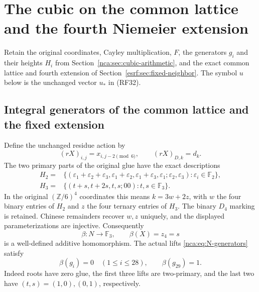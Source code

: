 \section{The cubic on the common lattice and the fourth Niemeier extension}
\label{jmv:sec:JM-extension}

Retain the original coordinates, Cayley multiplication, $F$, the generators $g_i$
and their heights $H_i$ from Section~\ref{nca:sec:cubic-arithmetic}, and the
exact common lattice and fourth extension of Section~\ref{esrf:sec:fixed-neighbor}.
The symbol $u$ below is the unchanged vector $u_*$ in (RF32).
\subsection{Integral generators of the common lattice and the fixed extension}

Define the unchanged residue action by
\[
 (rX)_{i,j}=x_{i,j-2\pmod6},\qquad (rX)_{D,k}=d_k.
\]
The two primary parts of the original glue have the exact descriptions
\begin{align*}
 H_2={}&\{(\varepsilon_1+\varepsilon_2+\varepsilon_3,
 \varepsilon_1+\varepsilon_2,\varepsilon_1+\varepsilon_3,
 \varepsilon_1;\varepsilon_2,\varepsilon_3):\varepsilon_i\in\mathbb F_2\},\\
 H_3={}&\{(t+s,t+2s,t,s;00):t,s\in\mathbb F_3\}.
\end{align*}
In the original \((\mathbb Z/6)^4\) coordinates this means
\(k=3w+2z\), with \(w\) the four binary entries of \(H_2\)
and \(z\) the four ternary entries of \(H_3\). The binary
\(D_4\) marking is retained. Chinese remainders recover \(w,z\)
uniquely, and the displayed parameterizations are injective.
Consequently
\[
 \beta:N\longrightarrow\mathbb F_3,\qquad \beta(X)=z_4=s
\]
is a well-defined additive homomorphism. The actual lifts
\eqref{nca:eq:N-generators} satisfy
\[
 \beta(g_i)=0\quad(1\leq i\leq28),\qquad \beta(g_{29})=1.
\]
Indeed roots have zero glue, the first three lifts are two-primary,
and the last two have \((t,s)=(1,0),(0,1)\), respectively.

